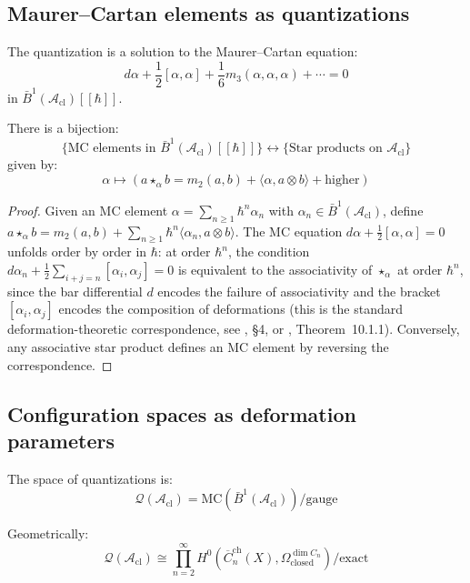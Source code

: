 \subsection{Maurer--Cartan elements as quantizations}

The quantization is a solution to the Maurer--Cartan equation:
\[d\alpha + \frac{1}{2}[\alpha, \alpha] + \frac{1}{6}m_3(\alpha, \alpha, \alpha) + \cdots = 0\]
in $\bar{B}^1(\mathcal{A}_{\text{cl}})[[\hbar]]$.

\begin{proposition}
\label{prop:mc-star-product}
There is a bijection:
\[\{\text{MC elements in } \bar{B}^1(\mathcal{A}_{\text{cl}})[[\hbar]]\} \longleftrightarrow \{\text{Star products on } \mathcal{A}_{\text{cl}}\}\]
given by:
\[\alpha \mapsto (a \star_\alpha b = m_2(a,b) + \langle \alpha, a \otimes b \rangle + \text{higher})\]
\end{proposition}

\begin{proof}
Given an MC element $\alpha = \sum_{n \geq 1} \hbar^n \alpha_n$ with $\alpha_n \in \bar{B}^1(\mathcal{A}_{\mathrm{cl}})$, define $a \star_\alpha b = m_2(a,b) + \sum_{n \geq 1} \hbar^n \langle \alpha_n, a \otimes b \rangle$.  The MC equation $d\alpha + \frac{1}{2}[\alpha,\alpha] = 0$ unfolds order by order in $\hbar$: at order $\hbar^n$, the condition $d\alpha_n + \frac{1}{2}\sum_{i+j=n}[\alpha_i,\alpha_j] = 0$ is equivalent to the associativity of $\star_\alpha$ at order $\hbar^n$, since the bar differential $d$ encodes the failure of associativity and the bracket $[\alpha_i,\alpha_j]$ encodes the composition of deformations (this is the standard deformation-theoretic correspondence, see \cite{Kontsevich03}, \S4, or \cite{LodayVallette}, Theorem~10.1.1).  Conversely, any associative star product defines an MC element by reversing the correspondence.
\end{proof}

\subsection{Configuration spaces as deformation parameters}

The space of quantizations is:
\[\mathcal{Q}(\mathcal{A}_{\text{cl}}) = \text{MC}(\bar{B}^1(\mathcal{A}_{\text{cl}}))/\text{gauge}\]

Geometrically:
\[\mathcal{Q}(\mathcal{A}_{\text{cl}}) \cong \prod_{n=2}^\infty H^0(\overline{C}_n^{\text{ch}}(X), \Omega^{\dim C_n}_{\text{closed}})/\text{exact}\]

